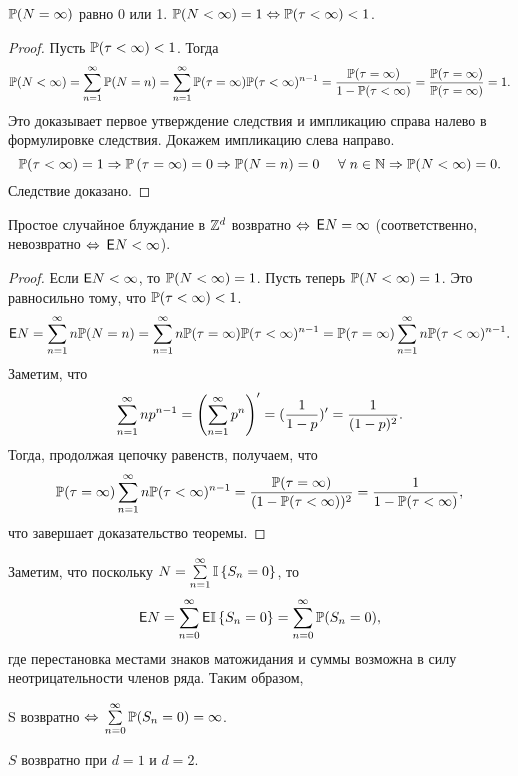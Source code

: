 \begin{imp}
	$\mathbb{P}(N = \infty)$ равно 0 или 1.
	$\mathbb{P}(N < \infty) = 1 \Leftrightarrow \mathbb{P}(\tau < \infty) < 1$.
\end{imp}

\begin{proof}
	Пусть $\mathbb{P}(\tau < \infty) < 1$.
	Тогда
	$$
		\mathbb{P}(N < \infty) = \sum\limits_{n=1}^{\infty} \mathbb{P}(N = n) = \sum\limits_{n=1}^{\infty} \mathbb{P}(\tau = \infty) \mathbb{P}(\tau < \infty)^{n-1}
		= \frac{\mathbb{P}(\tau = \infty)}{1 - \mathbb{P}(\tau < \infty)} = \frac{\mathbb{P}(\tau = \infty)}{\mathbb{P}(\tau = \infty)} = 1.
	$$
	Это доказывает первое утверждение следствия и импликацию справа налево в формулировке следствия.
	Докажем импликацию слева направо.
	$$
		\mathbb{P}(\tau < \infty) = 1 \Rightarrow \mathbb{P} \left(\tau = \infty \right) = 0 \Rightarrow \mathbb{P}(N = n) = 0
			\quad ~\forall\; n \in \mathbb{N} \Rightarrow \mathbb{P}(N < \infty) = 0.
	$$
	Следствие доказано.
\end{proof}

\begin{theorem}
	Простое случайное блуждание в $\mathbb{Z}^d$ возвратно $\Leftrightarrow$ $\mathsf{E} N = \infty$
	(соответственно, невозвратно $\Leftrightarrow$ $\mathsf{E} N < \infty$).
\end{theorem}

\begin{proof}
	Если $\mathsf{E} N < \infty$, то $\mathbb{P}(N<\infty) = 1$.
	Пусть теперь $\mathbb{P}(N<\infty) = 1$.
	Это равносильно тому, что $\mathbb{P}(\tau < \infty) < 1$.
	$$
		\mathsf{E} N = \sum\limits_{n=1}^{\infty} n\mathbb{P}(N=n)
	=	\sum\limits_{n=1}^{\infty} n\mathbb{P}(\tau = \infty)\mathbb{P}(\tau < \infty)^{n-1}
	=	\mathbb{P}(\tau = \infty)\sum\limits_{n=1}^{\infty} n\mathbb{P}(\tau < \infty)^{n-1}.
	$$
	Заметим, что
	$$
		\sum\limits_{n=1}^{\infty} np^{n-1} = \left(\sum\limits_{n=1}^{\infty} p^n\right)^{\prime} = (\frac1{1-p})^{\prime} = \frac1{(1-p)^2}.
	$$
	Тогда, продолжая цепочку равенств, получаем, что
	$$
		\mathbb{P}(\tau = \infty)\sum\limits_{n=1}^{\infty} n\mathbb{P}(\tau < \infty)^{n-1} =
		\frac{\mathbb{P}(\tau = \infty)}{(1 - \mathbb{P}(\tau < \infty))^2} = \frac1{1 - \mathbb{P}(\tau < \infty)},
	$$
	что завершает доказательство теоремы.
\end{proof}

\begin{note}
	Заметим, что поскольку $N = \sum\limits_{n=1}^{\infty} \mathbb{I} \left\{S_n = 0\right\}$, то
	$$
		\mathsf{E} N = \sum\limits_{n=0}^{\infty} \mathsf{E} \mathbb{I} \left\{S_n = 0\right\} = \sum\limits_{n=0}^{\infty} \mathbb{P}(S_n = 0),
	$$
	где перестановка местами знаков матожидания и суммы возможна в силу неотрицательности членов ряда.
	Таким образом,
	\begin{center}
		S возвратно $\Leftrightarrow$ $\sum\limits_{n=0}^{\infty} \mathbb{P}(S_n = 0) = \infty$.
	\end{center}
\end{note}

\begin{imp}
	$S$ возвратно при $d = 1$ и $d = 2$.
\end{imp}

